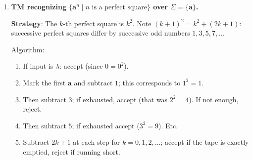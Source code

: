 \begin{enumerate}[{11.}1. ]
\begin{enumerate}
Transitions are given schematically. For each
$d\in\{\pmb{a},\pmb{b},\pmb{c}\}$,
\[
\delta(q_\text{start},d)=(q_d,\overline d,R),
\]
which marks the leftmost unprocessed symbol and records it in the state.  In
state $q_d$, move right over unmarked and marked input symbols until the first
blank is reached; then move one square left into $q_{\text{check},d}$.  In
$q_{\text{check},d}$, accept the pair if the scanned unmarked symbol is $d$ by
writing $\overline d$ and moving left to $q_\text{return}$; reject if it is a
different unmarked input symbol.  State $q_\text{return}$ moves left to the
left end of the tape and then returns to $q_\text{start}$. If
$q_\text{start}$ finds no unmarked input symbol, it enters $q_\text{accept}$.

\item \textbf{Linear Bounded Automaton (LBA)}: Since the tape head never needs to go beyond the input boundaries (matching leftmost/rightmost within the input), the TM above is already an LBA. The computation uses only the $n$ tape cells containing the input.

\item \textbf{Nondeterminism/multiple tapes}: A two-tape TM copies the input to tape 2, reverses tape 2, and compares tape 1 with tape 2 symbol by symbol --- $O(n)$ time. A nondeterministic TM can guess the center and verify matching from both ends simultaneously.
\end{enumerate}

\item \textbf{TM recognizing $\{\pmb{a}^n \mid n \text{ is a perfect square}\}$ over $\Sigma=\{\pmb{a}\}$.}

\textbf{Strategy}: The $k$-th perfect square is $k^2$. Note $(k+1)^2 = k^2 + (2k+1)$: successive perfect squares differ by successive odd numbers $1, 3, 5, 7, \ldots$

Algorithm:
\begin{enumerate}[1.]
\item If input is $\lambda$: accept (since $0 = 0^2$).
\item Mark the first $\pmb{a}$ and subtract $1$; this corresponds to $1^2=1$.
\item Then subtract $3$; if exhausted, accept (that was $2^2=4$). If not enough, reject.
\item Then subtract $5$; if exhausted accept ($3^2=9$). Etc.
\item Subtract $2k+1$ at each step for $k=0,1,2,\ldots$; accept if the tape is exactly emptied, reject if running short.
\end{enumerate}


\end{enumerate}
